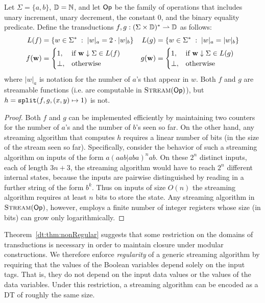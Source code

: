 \begin{theorem}
\label{dt:thm:nonRegular}
Let $\Sigma = \{a,b\}$, $\mathbb{D} = \mathbb{N}$, and let $\textsf{Op}$ be the family of operations that includes unary increment, unary decrement, the constant $0$, and the binary equality predicate. Define the transductions $f, g: (\Sigma \times \mathbb{D})^{*} \rightharpoonup \mathbb{D}$ as follows:
\begin{align*}
L(f) &= \{ w \in \Sigma^{*} \;:\; |w|_a = 2 \cdot |w|_b \}
&
L(g) &= \{ w \in \Sigma^{*} \;:\; |w|_a = |w|_b \}
\\
f(\textbf{w}) &= \begin{cases}
  1, &\text{if $\textbf{w} \downarrow \Sigma \in L(f)$} \\
  \bot, &\text{otherwise}
\end{cases}
&
g(\textbf{w}) &= \begin{cases}
  1, &\text{if $\textbf{w} \downarrow \Sigma \in L(g)$} \\
  \bot, &\text{otherwise}
\end{cases}
\end{align*}
where $|w|_a$ is notation for the number of $a$'s that appear in $w$. Both $f$ and $g$ are streamable functions (i.e. are computable in $\textsc{Stream}(\textsf{Op})$), but $h = \texttt{split}(f, g, (x,y) \mapsto 1)$ is not.
\end{theorem}
\begin{proof}[Proof]
Both $f$ and $g$ can be implemented efficiently by maintaining two counters for the number of $a$'s and the number of $b$'s seen so far.
On the other hand, any streaming algorithm that computes $h$ requires a linear number of bits (in the size of the stream seen so far). Specifically, consider the behavior of such a streaming algorithm on inputs of the form $a(aab | aba)^n ab$. On these $2^n$ distinct inputs, each of length $3n+3$, the streaming algorithm would have to reach $2^n$ different internal states, because the inputs are pairwise distinguished by reading in a further string of the form $b^k$. Thus on inputs of size $O(n)$ the streaming algorithm requires at least $n$ bits to store the state.
Any streaming algorithm in $\textsc{Stream}(\textsf{Op})$, however, employs a finite number of integer registers whose size (in bits) can grow only logarithmically.
\end{proof}

Theorem~\ref{dt:thm:nonRegular} suggests that some restriction on the domains of transductions is necessary in order to maintain closure under modular constructions. We therefore enforce \emph{regularity} of a generic streaming algorithm by requiring that the values of the Boolean variables depend solely on the input tags. That is, they do not depend on the input data values or the values of the data variables. Under this restriction, a streaming algorithm can be encoded as a DT of roughly the same size.

